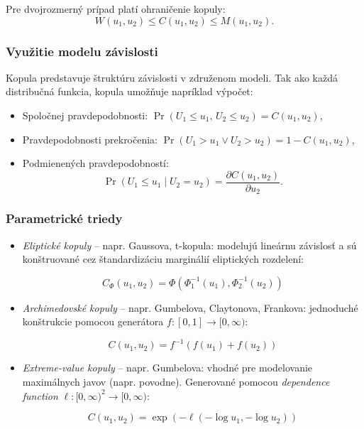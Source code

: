 Pre dvojrozmerný prípad platí ohraničenie kopuly:
\[
W(u_1, u_2) \leq C(u_1, u_2) \leq M(u_1, u_2).
\]

\subsubsection{Využitie modelu závislosti}

Kopula predstavuje štruktúru závislosti v združenom modeli. Tak ako každá distribučná funkcia, kopula umožňuje napríklad výpočet:

\begin{itemize}
  \item Spoločnej pravdepodobnosti: $\Pr(U_1 \leq u_1,\, U_2 \leq u_2) = C(u_1, u_2)$,
  \item Pravdepodobnosti prekročenia: $\Pr(U_1 > u_1 \vee U_2 > u_2) = 1 - C(u_1, u_2)$,
  \item Podmienených pravdepodobností:
  \[
  \Pr(U_1 \leq u_1 \mid U_2 = u_2) = \frac{\partial C(u_1, u_2)}{\partial u_2}.
  \]
\end{itemize}

\subsubsection{Parametrické triedy}\label{subsubsec:parametric_copula}

\begin{itemize}
  \item \textit{Eliptické kopuly} – napr. Gaussova, t-kopula: modelujú lineárnu závislosť a sú konštruované cez štandardizáciu marginálií eliptických rozdelení:
  
  \begin{equation}
    C_{\Phi}(u_1, u_2) = \Phi\left( \Phi_1^{-1}(u_1), \Phi_2^{-1}(u_2) \right)
  \end{equation}

  \item \textit{Archimedovské kopuly} – napr. Gumbelova, Claytonova, Frankova: jednoduché konštrukcie pomocou generátora $f:[0,1] \to [0,\infty)$:

  \begin{equation}
  C(u_1, u_2) = f^{-1}\left( f(u_1) + f(u_2) \right)
  \end{equation}

  \item \textit{Extreme-value kopuly} – napr. Gumbelova: vhodné pre modelovanie maximálnych javov (napr. povodne). Generované pomocou \textit{dependence function} $\ell : [0, \infty)^2 \rightarrow [0, \infty)$:

  \begin{equation}
  C(u_1, u_2) = \exp\left(-\ell(-\log u_1, -\log u_2)\right)
  \end{equation}
  
\end{itemize}


